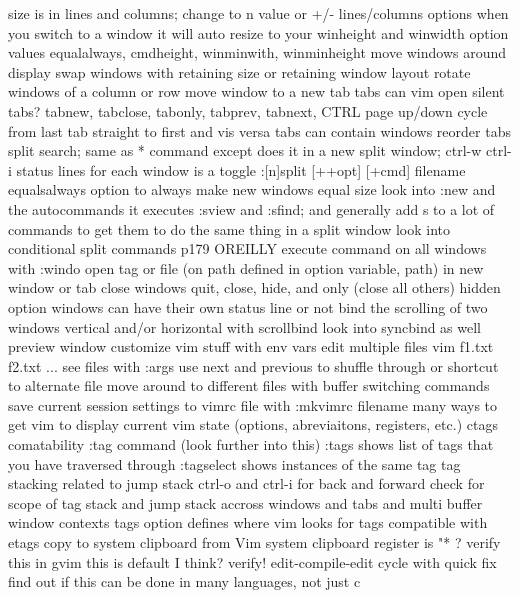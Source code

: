 \documentclass[12pt]{book}
\begin{document}
{{        size is in lines and columns; change to n value or +/- lines/columns
        options
          when you switch to a window it will auto resize to your winheight and winwidth option values
          equalalways, cmdheight, winminwith, winminheight
      move windows around display
        swap windows with retaining size or retaining window layout
        rotate windows of a column or row
        move window to a new tab
      tabs
        can vim open silent tabs?
        tabnew, tabclose, tabonly, tabprev, tabnext, CTRL page up/down
        cycle from last tab straight to first and vis versa
        tabs can contain windows
        reorder tabs
      split search; same as * command except does it in a new split window; ctrl-w ctrl-i
      status lines for each window is a toggle
      :[n]split [++opt] [+cmd] filename
      equalsalways option to always make new windows equal size
      look into :new and the autocommands it executes
      :sview and :sfind; and generally add s to a lot of commands to get them to do the same thing in a split window
      look into conditional split commands p179 OREILLY
      execute command on all windows with :windo
      open tag or file (on path defined in option variable, path) in new window or tab
      close windows
        quit, close, hide, and only (close all others)
          hidden option
      windows can have their own status line or not
      bind the scrolling of two windows vertical and/or horizontal with scrollbind
        look into syncbind as well
      preview window
    customize vim stuff with env vars
    edit multiple files
      vim f1.txt f2.txt ...
      see files with :args
      use next and previous to shuffle through or shortcut to alternate file
    move around to different files with buffer switching commands
    save current session settings to vimrc file with :mkvimrc filename
  many ways to get vim to display current vim state (options, abreviaitons, registers, etc.)
  ctags comatability
    :tag command (look further into this)
    :tags shows list of tags that you have traversed through
    :tagselect shows instances of the same tag
    tag stacking
      related to jump stack
      ctrl-o and ctrl-i for back and forward
      check for scope of tag stack and jump stack accross windows and tabs and multi buffer window contexts
    tags option defines where vim looks for tags
    compatible with etags
  copy to system clipboard from Vim
    system clipboard register is "* ?  verify this
    in gvim this is default I think? verify!
  edit-compile-edit cycle with quick fix
    find out if this can be done in many languages, not just c
}}
\end{document}
